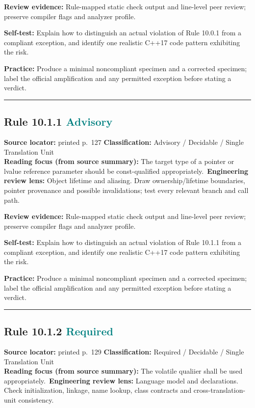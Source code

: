 \documentclass[10pt,letterpaper]{article}
\begin{document}
\textbf{Review evidence:} Rule-mapped static check output and line-level peer review; preserve compiler flags and analyzer profile.

\textbf{Self-test:} Explain how to distinguish an actual violation of Rule 10.0.1 from a compliant exception, and identify one realistic C++17 code pattern exhibiting the risk.\par
\textbf{Practice:} Produce a minimal noncompliant specimen and a corrected specimen; label the official amplification and any permitted exception before stating a verdict.
\smallskip\hrule\smallskip
\subsection*{Rule 10.1.1 \enspace \texorpdfstring{\small\textcolor{teal}{Advisory}}{Advisory}}
\noindent\textbf{Source locator:} printed p.~127 \quad\textbf{Classification:} Advisory / Decidable / Single Translation Unit\\
\textbf{Reading focus (from source summary):} The target type of a pointer or lvalue reference parameter should be const-qualified appropriately.\
\textbf{Engineering review lens:} Object lifetime and aliasing. Draw ownership/lifetime boundaries, pointer provenance and possible invalidations; test every relevant branch and call path.

\textbf{Review evidence:} Rule-mapped static check output and line-level peer review; preserve compiler flags and analyzer profile.

\textbf{Self-test:} Explain how to distinguish an actual violation of Rule 10.1.1 from a compliant exception, and identify one realistic C++17 code pattern exhibiting the risk.\par
\textbf{Practice:} Produce a minimal noncompliant specimen and a corrected specimen; label the official amplification and any permitted exception before stating a verdict.
\smallskip\hrule\smallskip
\subsection*{Rule 10.1.2 \enspace \texorpdfstring{\small\textcolor{teal}{Required}}{Required}}
\noindent\textbf{Source locator:} printed p.~129 \quad\textbf{Classification:} Required / Decidable / Single Translation Unit\\
\textbf{Reading focus (from source summary):} The volatile qualiier shall be used appropriately.\
\textbf{Engineering review lens:} Language model and declarations. Check initialization, linkage, name lookup, class contracts and cross-translation-unit consistency.
\end{document}
